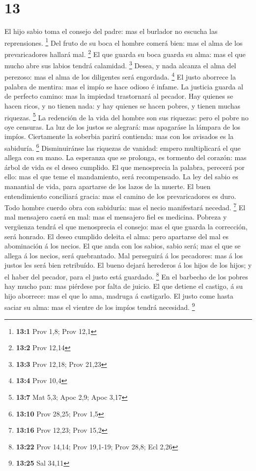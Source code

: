 \hypertarget{section-12}{%
\section{13}\label{section-12}}

 El hijo sabio toma el consejo del padre: mas el burlador
no escucha las reprensiones. \footnote{\textbf{13:1} Prov 1,8; Prov 12,1}
 Del fruto de su boca el hombre comerá bien: mas el alma
de los prevaricadores hallará mal. \footnote{\textbf{13:2} Prov 12,14}
 El que guarda su boca guarda su alma: mas el que mucho
abre sus labios tendrá calamidad. \footnote{\textbf{13:3} Prov 12,18;
  Prov 21,23}  Desea, y nada alcanza el alma del perezoso:
mas el alma de los diligentes será engordada. \footnote{\textbf{13:4}
  Prov 10,4}  El justo aborrece la palabra de mentira: mas
el impío se hace odioso é infame.  La justicia guarda al
de perfecto camino: mas la impiedad trastornará al pecador.
 Hay quienes se hacen ricos, y no tienen nada: y hay
quienes se hacen pobres, y tienen muchas riquezas. \footnote{\textbf{13:7}
  Mat 5,3; Apoc 2,9; Apoc 3,17}  La redención de la vida
del hombre son sus riquezas: pero el pobre no oye censuras.
 La luz de los justos se alegrará: mas apagaráse la
lámpara de los impíos.  Ciertamente la soberbia parirá
contienda: mas con los avisados es la sabiduría. \footnote{\textbf{13:10}
  Prov 28,25; Prov 1,5}  Disminuiránse las riquezas de
vanidad: empero multiplicará el que allega con su mano. 
La esperanza que se prolonga, es tormento del corazón: mas árbol de vida
es el deseo cumplido.  El que menosprecia la palabra,
perecerá por ello: mas el que teme el mandamiento, será recompensado.
 La ley del sabio es manantial de vida, para apartarse de
los lazos de la muerte.  El buen entendimiento conciliará
gracia: mas el camino de los prevaricadores es duro. 
Todo hombre cuerdo obra con sabiduría: mas el necio manifestará necedad.
\footnote{\textbf{13:16} Prov 12,23; Prov 15,2}  El mal
mensajero caerá en mal: mas el mensajero fiel es medicina.
 Pobreza y vergüenza tendrá el que menosprecia el
consejo: mas el que guarda la corrección, será honrado. 
El deseo cumplido deleita el alma: pero apartarse del mal es abominación
á los necios.  El que anda con los sabios, sabio será;
mas el que se allega á los necios, será quebrantado.  Mal
perseguirá á los pecadores: mas á los justos les será bien retribuído.
 El bueno dejará herederos á los hijos de los hijos; y el
haber del pecador, para el justo está guardado. \footnote{\textbf{13:22}
  Prov 14,14; Prov 19,1-19; Prov 28,8; Ecl 2,26}  En el
barbecho de los pobres hay mucho pan: mas piérdese por falta de juicio.
 El que detiene el castigo, á su hijo aborrece: mas el
que lo ama, madruga á castigarlo.  El justo come hasta
saciar su alma: mas el vientre de los impíos tendrá necesidad.
\footnote{\textbf{13:25} Sal 34,11}

